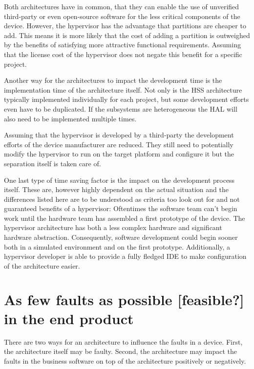 Both architectures have in common, that they can enable the use of unverified third-party or even open-source software for the less critical  components of the device. However, the hypervisor has the advantage that partitions are cheaper to add. This means it is more likely that the cost of adding a partition is outweighed by the benefits of satisfying more attractive functional requirements. Assuming that the license cost of the hypervisor does not negate this benefit for a specific project.

Another way for the architectures to impact the development time is the implementation time of the architecture itself. Not only is the \gls{HSS} architecture typically implemented individually for each project, but some development efforts even have to be duplicated. If the subsystems are heterogeneous the \gls{HAL} will also need to be implemented multiple times. 

Assuming that the hypervisor is developed by a third-party the development efforts of the device manufacturer are reduced. They still need to potentially modify the hypervisor to run on the target platform and configure it but the separation itself is taken care of.

One last type of time saving factor is the impact on the development process itself. These are, however highly dependent on the actual situation and the differences listed here are to be understood as criteria too look out for and not guaranteed benefits of a hypervisor: Oftentimes the software team can't begin work until the hardware team has assembled a first prototype of the device. The hypervisor architecture has both a less complex hardware and significant hardware abstraction. Consequently, software development could begin sooner both in a simulated environment and on the first prototype. Additionally, a hypervisor developer is able to provide a fully fledged \gls{IDE} to make configuration of the architecture easier.


\section{As few faults as possible [feasible?] in the end product}
There are two ways for an architecture to influence the faults in a device. First, the architecture itself may be faulty. Second, the architecture may impact the faults in the business software on top of the architecture positively or negatively.
